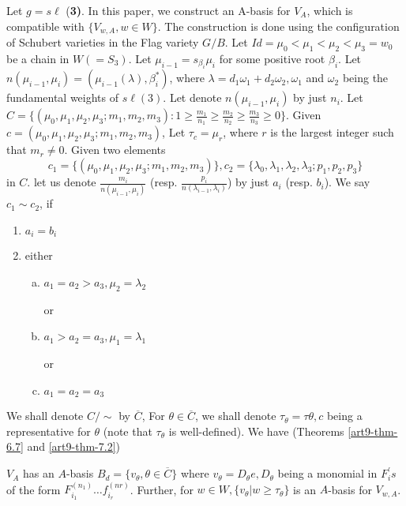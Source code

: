 Let $g=s\ell$ {(\bf 3)}. In this paper, we construct an A-basis for $V_{A}$, which is compatible with $\{V_{w,A}, w \in W\}$. The construction is done using the configuration of Schubert varieties in the Flag variety $G/B$. Let $Id=\mu_{0} < \mu_{1} < \mu_{2} < \mu_{3} = w_{0}$ be a chain  in $W(=S_{3})$. Let $\mu_{i-1} = s_{\beta_{i}}\mu_{i}$ for some positive root $\beta_{i}$. Let $n(\mu_{i-1},\mu_{i})= (\mu_{i-1}(\lambda), \beta_{i}^{*})$, where $\lambda = d_{1}\omega_{1} + d_{2}\omega_{2}, \omega_{1}$ and $\omega_{2}$ being the fundamental weights of $s\ell(3)$. Let denote $n(\mu_{i-1}, \mu_{i})$ by just $n_{i}$. Let $C = \{ (\mu_{0}, \mu_{1}, \mu_{2}, \mu_{3};m_{1}, m_{2}, m_{3}) : 1 \geq \frac{m_{1}}{n_{1}}\geq \frac{m_{2}}{n_{2}} \geq \frac{m_{3}}{n_{3}} \geq 0 \}$. Given $c=(\mu_{0}, \mu_{1}, \mu_{2}, \mu_{3};m_{1}, m_{2}, m_{3})$, Let $\tau_{c} = \mu_{r}$, where $r$ is the largest integer such that $m_{r}\neq 0$. Given two elements
$$
c_{1} = \{(\mu_{0}, \mu_{1}, \mu_{2}, \mu_{3};m_{1}, m_{2}, m_{3})\}, c_{2}=\{ \lambda_{0}, \lambda_{1}, \lambda_{2}, \lambda_{3} ; p_{1}, p_{2},p_{3}\}
$$
in $C$. let us denote $\frac{m_{i}}{n(\mu_{i-1},\mu_{i})}$ (resp. $\frac{p_{i}}{n(\lambda_{i-1}, \lambda_{i})}$) by just $a_{i}$ (resp. $b_{i}$). We say $c_{1}\sim c_{2}$, if
\begin{enumerate}[(1)]
\item $a_{i}= b_{i}$
\item either
   \begin{enumerate}[(a)]
    \item $a_{1} =a_{2} > a_{3}, \mu_{2} = \lambda_{2}$

    or 

    \item $a_{1} > a_{2} =a_{3}, \mu_{1} =\lambda_{1}$

    or

    \item $a_{1} = a_{2} = a_{3} $
    \end{enumerate}
\end{enumerate}
We shall denote $C/\sim $ by $\overline{C}$, For $\theta \in \overline{C}$, we shall denote $\tau_{\theta} = \tau{\theta}, c$ being a representative for $\theta$ (note that $\tau_{\theta}$ is well-defined). We have (Theorems \ref{art9-thm-6.7} and \ref{art9-thm-7.2})

\begin{theorem}
$V_{A}$ has an $A$-basis $B_{d}=\{v_{\theta}, \theta \in \overline{C}\}$ where $v_{\theta} = D_{\theta}e, D_{\theta}$
being a monomial in $F_{i}^{'}s$ of the form $F_{i_{1}}^{(n_{1})}\ldots f_{i_{r}}^{(nr)}$. Further, for
$w \in W, \{v_{\theta} | w \geq \tau_{\theta}\}$ is an $A$-basis for $V_{w, A}$.
 \end{theorem}

